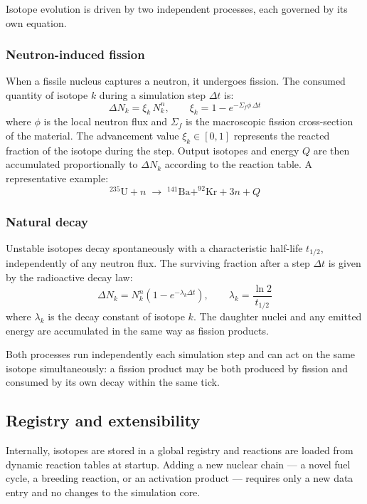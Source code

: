 \documentclass{report}
\begin{document}
Isotope evolution is driven by two independent processes, each governed by its own equation.

\subsubsection*{Neutron-induced fission}

When a fissile nucleus captures a neutron, it undergoes fission. The consumed quantity
of isotope $k$ during a simulation step $\Delta t$ is:
\[
\Delta N_k = \xi_k\, N_k^n, \qquad \xi_k = 1 - e^{-\Sigma_f \phi\, \Delta t}
\]
where $\phi$ is the local neutron flux and $\Sigma_f$ is the macroscopic fission
cross-section of the material. The advancement value $\xi_k \in [0,1]$ represents
the reacted fraction of the isotope during the step. Output isotopes and energy $Q$
are then accumulated proportionally to $\Delta N_k$ according to the reaction table.
A representative example:
\[
^{235}\text{U} + n \;\rightarrow\; ^{141}\text{Ba} + ^{92}\text{Kr} + 3n + Q
\]

\subsubsection*{Natural decay}

Unstable isotopes decay spontaneously with a characteristic half-life $t_{1/2}$,
independently of any neutron flux. The surviving fraction after a step $\Delta t$ is
given by the radioactive decay law:
\[
\Delta N_k = N_k^n \left(1 - e^{-\lambda_k \Delta t}\right), \qquad
\lambda_k = \frac{\ln 2}{t_{1/2}}
\]
where $\lambda_k$ is the decay constant of isotope $k$. The daughter nuclei and
any emitted energy are accumulated in the same way as fission products.

Both processes run independently each simulation step and can act on the same isotope
simultaneously: a fission product may be both produced by fission and consumed by its
own decay within the same tick.

\subsection{Registry and extensibility}

Internally, isotopes are stored in a global registry and reactions are loaded from
dynamic reaction tables at startup. Adding a new nuclear chain — a novel fuel cycle,
a breeding reaction, or an activation product — requires only a new data entry and no
changes to the simulation core.
\end{document}

